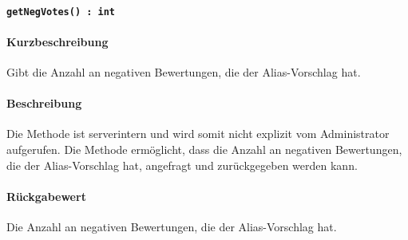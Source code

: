 \paragraph{\texttt{getNegVotes() : int}}%
\paragraph*{Kurzbeschreibung}
Gibt die Anzahl an negativen Bewertungen, die der Alias-Vorschlag hat.
\paragraph*{Beschreibung}
Die Methode ist serverintern und wird somit nicht explizit vom Administrator aufgerufen.
Die Methode ermöglicht, dass die Anzahl an negativen Bewertungen, die der Alias-Vorschlag hat, angefragt und zurückgegeben werden kann.
\paragraph*{Rückgabewert}
Die Anzahl an negativen Bewertungen, die der Alias-Vorschlag hat.
